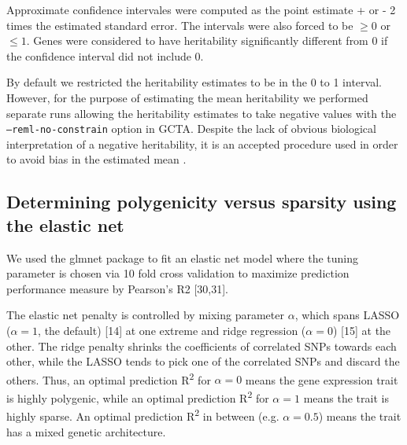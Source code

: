 \documentclass[10pt,letterpaper]{article}
\begin{document}
Approximate confidence intervales were computed as the point estimate + or - 
2 times the estimated standard error. The intervals were also forced to be $\ge 0 $ or $\le 1$. 
Genes were considered to have heritability significantly different from 0 if the confidence interval did not include 0.

By default we restricted the heritability estimates to be in the 0 to 1 interval. However, 
for the purpose of estimating the mean heritability we performed separate runs allowing the heritability estimates to 
take negative values with the \texttt{--reml-no-constrain} option in GCTA. Despite the lack of obvious biological interpretation of a negative heritability, 
it is an accepted procedure used in order to avoid bias in the estimated mean \cite{Price_2011,Wright_2014}.


\subsection*{Determining polygenicity versus sparsity using the elastic
net}\label{determining-polygenicity-versus-sparsity-using-the-elastic-net}

We used the glmnet package to fit an elastic net model where the tuning parameter is chosen via 10 fold cross validation to maximize prediction performance measure by Pearson's R2 {[}30,31{]}.


The elastic net penalty is controlled by mixing parameter \(\alpha\),
which spans LASSO (\(\alpha=1\), the default) {[}14{]} at one extreme
and ridge regression (\(\alpha=0\)) {[}15{]} at the other. The ridge
penalty shrinks the coefficients of correlated SNPs towards each other,
while the LASSO tends to pick one of the correlated SNPs and discard the
others. Thus, an optimal prediction R\textsuperscript{2} for
\(\alpha=0\) means the gene expression trait is highly polygenic, while
an optimal prediction R\textsuperscript{2} for \(\alpha=1\) means the
trait is highly sparse. An optimal prediction R\textsuperscript{2} in
between (e.g. \(\alpha=0.5\)) means the trait has a mixed genetic
architecture.
\end{document}
